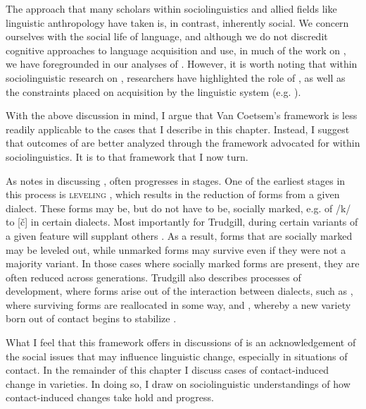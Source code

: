 \documentclass[output=paper]{langsci/langscibook}
\begin{document}
  The approach that many scholars within sociolinguistics and allied fields like linguistic anthropology have taken is, in contrast, inherently social. We concern ourselves with the social life of language, and although we do not discredit cognitive approaches to language acquisition and use, in much of the work on , we have foregrounded  in our analyses of . However, it is worth noting that within sociolinguistic research on , researchers have highlighted the role of , as well as the constraints placed on acquisition by the linguistic system (e.g. \citealt{Nycz2013,Nycz2016}).  

  With the above discussion in mind, I argue that Van Coetsem’s framework is less readily applicable to the cases that I describe in this chapter. Instead, I suggest that outcomes of   are better analyzed through the framework advocated for within sociolinguistics. It is to that framework that I now turn.  

  As \citet{Trudgill2004} notes in discussing  ,  often progresses in stages. One of the earliest stages in this process is \textsc{leveling} \citep[83]{Trudgill2004}, which results in the reduction of forms from a given dialect. These forms may be, but do not have to be, socially marked, e.g.  of /k/ to [č] in certain  dialects. Most importantly for Trudgill, during  certain variants of a given feature will supplant others \citep[85]{Trudgill2004}. As a result, forms that are socially marked may be leveled out, while unmarked forms may survive even if they were not a majority variant. In those cases where socially marked forms are present, they are often reduced across generations. Trudgill also describes processes of  development, where forms arise out of the interaction between dialects, such as , where surviving forms are reallocated in some way, and , whereby a new variety born out of contact begins to stabilize \citep{Trudgill2004}. 

  What I feel that this framework offers in discussions of   is an acknowledgement of the social issues that may influence linguistic change, especially in situations of contact. In the remainder of this chapter I discuss cases of contact-induced change in  varieties. In doing so, I draw on sociolinguistic understandings of how contact-induced changes take hold and progress. 
\end{document}
